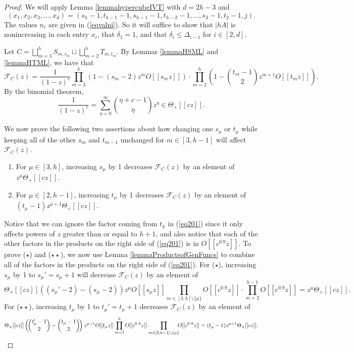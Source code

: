 \documentclass{daj}
\theoremstyle{definition}
\theoremstyle{remark}
\numberwithin{equation}{section}
\numberwithin{theorem}{section}
\newcommand{\calf}{\mathcal{F}}
\begin{document}
\begin{proof}
    We will apply Lemma \ref{lemmahypercubeIVT} with $d = 2h-3$ and \[(x_1,x_2,x_3,\ldots,x_{d}) = (s_h-1,t_{h-1}-1,s_{h-1}-1,t_{h-2}-1,\ldots,s_{3}-1,t_2-1,j).\] The values $n_i$ are given in (\ref{eqvalni}). So it will suffice to show that $|hA|$ is nonincreasing in each entry $x_i$, that $\delta_1 = 1$, and that $\delta_i \leq \Delta_{i-1}$ for $i \in [2,d]$.

    Let $C = \displaystyle\bigsqcup_{m=3}^h S_{m,s_m} \sqcup \displaystyle\bigsqcup_{m=2}^h T_{m,t_m}$. By Lemmas \ref{lemmaHSML} and \ref{lemmaHTML}, we have that \begin{equation}\label{eq201}
        \calf_{C}(z) = \frac{1}{(1-z)^c} \prod_{m=3}^h (1-(s_m-2)z^mO[[s_mz]])\cdot  \prod_{m=2}^h \left(1-\binom{t_m-1}{2}z^{m+1}O[[t_mz]]\right).
    \end{equation} By the binomial theorem, \begin{equation}\label{eqbinomial}\frac{1}{(1-z)^c}= \sum_{\eta=0}^\infty \binom{\eta+c-1}{\eta} z^\eta \in \Theta_+[[c z]].\end{equation}
    
    We now prove the following two assertions about how changing one $s_\mu$ or $t_\mu$ while keeping all of the other $s_m$ and $t_{m-1}$ unchanged for $m \in [3,h-1]$ will affect $\calf_{C}(z)$.
    \begin{enumerate}[label = (\arabic*)]
        \item[($\star$)] For $\mu \in [3,h]$, increasing $s_\mu$ by 1 decreases $\calf_C(z)$ by an element of $z^\mu\Theta_+[[cz]]$.
        \item[($\star \star$)]  For $\mu \in [2,h-1]$, increasing $t_\mu$ by 1 decreases $\calf_C(z)$ by an element of $(t_\mu-1)z^{\mu+1}\Theta_+[[cz]]$.
    \end{enumerate}
    Notice that we can ignore the factor coming from $t_h$ in (\ref{eq201}) since it only affects powers of $z$ greater than or equal to $h+1$, and also notice that each of the other factors in the products on the right side of (\ref{eq201}) is in $O[[c^{0.9}z]]$. 
    To prove ($\star$) and ($\star \star$), we now use Lemma \ref{lemmaProductsofGenFuncs} to combine all of the factors in the products on the right side of (\ref{eq201}). For ($\star$), increasing $s_\mu$ by 1 to $s_\mu'=s_\mu+1$ will decrease $\calf_C(z)$ by an element of \[\Theta_+[[cz]]((s_\mu'-2)-(s_\mu-2))z^\mu O[[s_\mu z]]\prod_{m\in [3,h] \setminus \{\mu\}} O[[c^{0.9}z]] \cdot \prod_{m=2}^{h-1} O[[c^{0.9}z]] = z^\mu\Theta_+[[cz]].\] For ($\star \star$), increasing $t_\mu$ by 1 to $t_\mu'=t_\mu+1$ decreases $\calf_C(z)$ by an element of 
    \[\Theta_+[[cz]]\left(\hspace{-2 pt}\binom{t_\mu'-1}{2}-\binom{t_\mu-1}{2}\hspace{-2 pt}\right)z^{\mu+1}O[[t_\mu z]] \prod_{m=3}^h O[[c^{0.9}z]] \cdot \hspace{-4.5 pt}\prod_{m \in [2,h-1] \setminus \{\mu\}}\hspace{-4.5 pt} O[[c^{0.9}z]]= (t_\mu-1)z^{\mu+1} \Theta_+[[cz]].\]


\end{proof}
\end{document}
